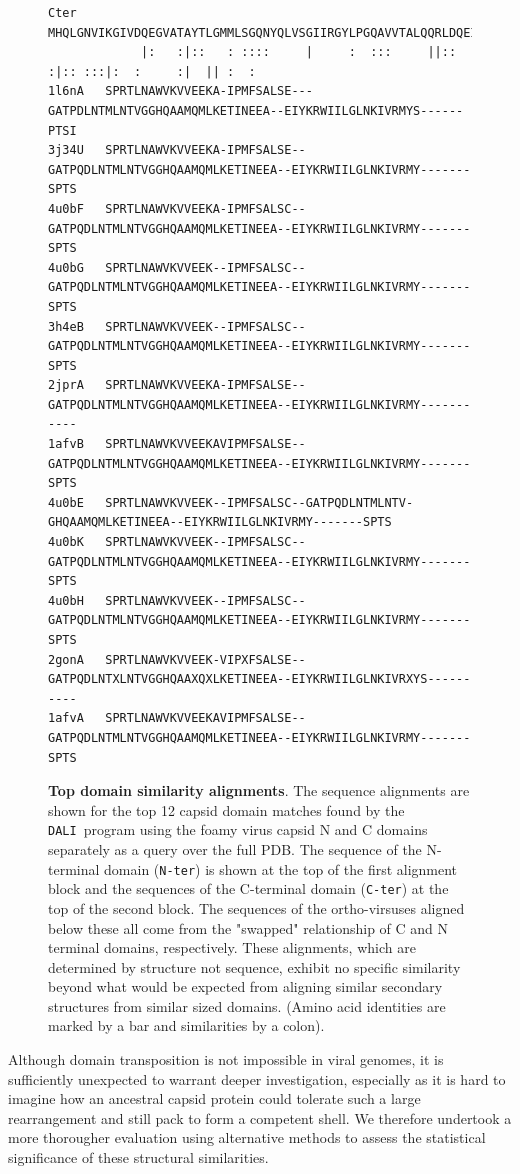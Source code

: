 \documentclass[preprint,12pt]{elsarticle}
\newcommand{\DALI}{{\tt DALI}}
\begin{document}
\begin{figure}
\begin{tiny}
\begin{Verbatim}[frame=single]
Cter    MHQLGNVIKGIVDQEGVATAYTLGMMLSGQNYQLVSGIIRGYLPGQAVVTALQQRLDQEIDNQTRAETFIQHLNAVYEILGLNARGQSIRL
             |:   :|::   : ::::     |     :  :::     ||:: :|:: :::|:  :     :|  || :  :    
1l6nA   SPRTLNAWVKVVEEKA-IPMFSALSE---GATPDLNTMLNTVGGHQAAMQMLKETINEEA--EIYKRWIILGLNKIVRMYS------PTSI
3j34U   SPRTLNAWVKVVEEKA-IPMFSALSE--GATPQDLNTMLNTVGGHQAAMQMLKETINEEA--EIYKRWIILGLNKIVRMY-------SPTS
4u0bF   SPRTLNAWVKVVEEKA-IPMFSALSC--GATPQDLNTMLNTVGGHQAAMQMLKETINEEA--EIYKRWIILGLNKIVRMY-------SPTS
4u0bG   SPRTLNAWVKVVEEK--IPMFSALSC--GATPQDLNTMLNTVGGHQAAMQMLKETINEEA--EIYKRWIILGLNKIVRMY-------SPTS
3h4eB   SPRTLNAWVKVVEEK--IPMFSALSC--GATPQDLNTMLNTVGGHQAAMQMLKETINEEA--EIYKRWIILGLNKIVRMY-------SPTS
2jprA   SPRTLNAWVKVVEEKA-IPMFSALSE--GATPQDLNTMLNTVGGHQAAMQMLKETINEEA--EIYKRWIILGLNKIVRMY-----------
1afvB   SPRTLNAWVKVVEEKAVIPMFSALSE--GATPQDLNTMLNTVGGHQAAMQMLKETINEEA--EIYKRWIILGLNKIVRMY-------SPTS
4u0bE   SPRTLNAWVKVVEEK--IPMFSALSC--GATPQDLNTMLNTV-GHQAAMQMLKETINEEA--EIYKRWIILGLNKIVRMY-------SPTS
4u0bK   SPRTLNAWVKVVEEK--IPMFSALSC--GATPQDLNTMLNTVGGHQAAMQMLKETINEEA--EIYKRWIILGLNKIVRMY-------SPTS
4u0bH   SPRTLNAWVKVVEEK--IPMFSALSC--GATPQDLNTMLNTVGGHQAAMQMLKETINEEA--EIYKRWIILGLNKIVRMY-------SPTS
2gonA   SPRTLNAWVKVVEEK-VIPXFSALSE--GATPQDLNTXLNTVGGHQAAXQXLKETINEEA--EIYKRWIILGLNKIVRXYS----------
1afvA   SPRTLNAWVKVVEEKAVIPMFSALSE--GATPQDLNTMLNTVGGHQAAMQMLKETINEEA--EIYKRWIILGLNKIVRMY-------SPTS
\end{Verbatim}
\end{tiny}
\begin{footnotesize}
\caption{
\label{Fig:swap}
{\bf Top domain similarity alignments}.
The sequence alignments are shown for the top 12 capsid domain matches found by the \DALI\ program
using the foamy virus capsid N and C domains separately as a query over the full PDB.
The sequence of the N-terminal domain ({\tt N-ter}) is shown at the top of the first alignment block and the
sequences of the C-terminal domain ({\tt C-ter}) at the top of the second block.   The sequences of the
ortho-virsuses aligned below these all come from the "swapped" relationship of C and N terminal domains,
respectively.   These alignments, which are determined by structure not sequence, exhibit no
specific similarity beyond what would be expected from aligning similar secondary structures from
similar sized domains. (Amino acid identities are marked by a bar and similarities by a colon).
}
\end{footnotesize}
\end{figure}

Although domain transposition is not impossible in viral genomes,  it is sufficiently
unexpected to warrant deeper investigation, especially as it is hard to imagine how an ancestral
capsid protein could tolerate such a large rearrangement and still pack to form a competent shell.
We therefore undertook a more thorougher evaluation using alternative methods to assess the statistical
significance of these structural similarities.
\end{document}

